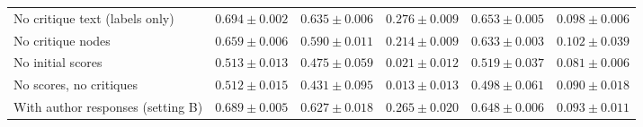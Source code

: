 \begin{table}[t]
\begin{tabular}{lccccc}
No critique text (labels only) & $0.694 \pm 0.002$ & $0.635 \pm 0.006$ & $0.276 \pm 0.009$ & $0.653 \pm 0.005$ & $0.098 \pm 0.006$ \\
No critique nodes & $0.659 \pm 0.006$ & $0.590 \pm 0.011$ & $0.214 \pm 0.009$ & $0.633 \pm 0.003$ & $0.102 \pm 0.039$ \\
No initial scores & $0.513 \pm 0.013$ & $0.475 \pm 0.059$ & $0.021 \pm 0.012$ & $0.519 \pm 0.037$ & $0.081 \pm 0.006$ \\
No scores, no critiques & $0.512 \pm 0.015$ & $0.431 \pm 0.095$ & $0.013 \pm 0.013$ & $0.498 \pm 0.061$ & $0.090 \pm 0.018$ \\
With author responses (setting B) & $0.689 \pm 0.005$ & $0.627 \pm 0.018$ & $0.265 \pm 0.020$ & $0.648 \pm 0.006$ & $0.093 \pm 0.011$ \\
\bottomrule
\end{tabular}
\end{table}
